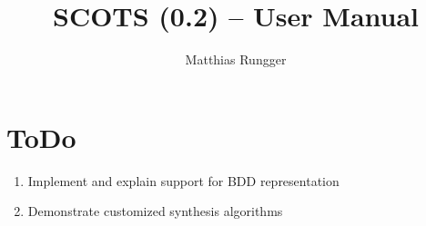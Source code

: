 \documentclass[a4paper]{amsart}
\title{SCOTS (0.2) -- User Manual}
\author{Matthias Rungger}
\begin{document}
  \maketitle

	\tableofcontents
	\newpage
	

\section{ToDo}

\begin{enumerate}
  \item Implement and explain support for BDD representation
  \item Demonstrate customized synthesis algorithms
\end{enumerate}


%
%
%
%
%
%
\end{document}
